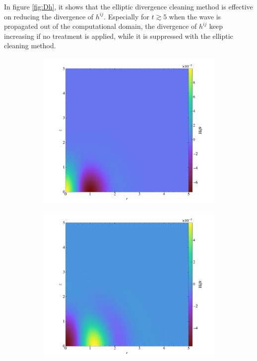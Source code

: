 In figure \ref{fig:Dh}, it shows that the elliptic divergence cleaning method is effective on
reducing the divergence of $h^{ij}$.
Especially for $t \gtrsim 5$ when the wave is propagated out of the computational domain,
the divergence of $h^{ij}$ keep increasing if no treatment is applied,
while it is suppressed with the elliptic cleaning method.
\begin{figure}[h!]
\centering
\begin{subfigure}{.5\textwidth}
  \centering
  \includegraphics[width=\linewidth]{result_hij_0000.pdf}
  \label{fig:hij9_0}
\end{subfigure}%
\begin{subfigure}{.5\textwidth}
  \centering
  \includegraphics[width=\linewidth]{result_hij_0010.pdf}
  \label{fig:hij9_1}
\end{subfigure}%


\end{figure}
